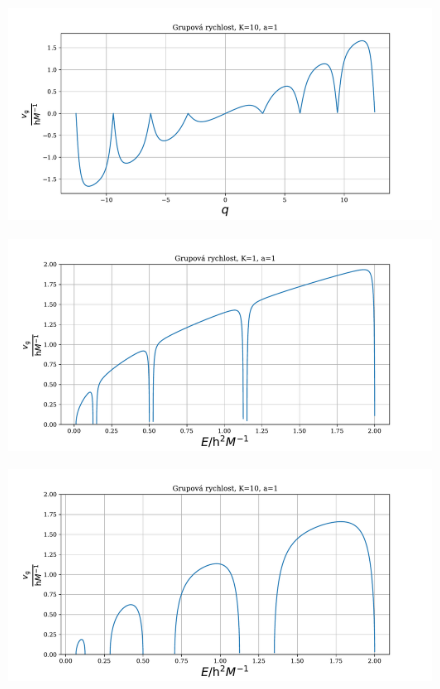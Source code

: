 \documentclass[10pt,a4paper]{article}
\begin{document}
\begin{figure}[!ht]
    \centering
    \includegraphics[scale=0.65]{grupova10_q.pdf}
\end{figure}

\begin{figure}[!ht]
    \centering
    \includegraphics[scale=0.65]{grupova1_E.pdf}
\end{figure}

\begin{figure}[!ht]
    \centering
    \includegraphics[scale=0.65]{grupova10_E.pdf}
\end{figure}
\end{document}
